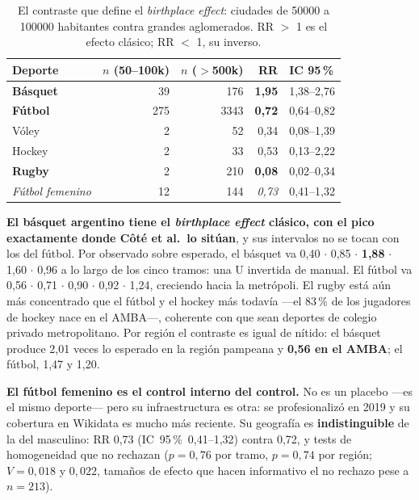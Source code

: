 \documentclass[11pt,a4paper]{article}
\newcommand{\ic}[2]{\mbox{IC 95\,\% #1--#2}}
\begin{document}
\begin{table}[!htb]\centering\small
\caption{El contraste que define el \emph{birthplace effect}: ciudades de
\num{50000} a \num{100000} habitantes contra grandes aglomerados. RR $>$ 1 es el
efecto clásico; RR $<$ 1, su inverso.}
\begin{tabular}{@{}lrrrl@{}}
\toprule
\textbf{Deporte} & \textbf{$n$ (50--100k)} & \textbf{$n$ ($>$500k)} &
\textbf{RR} & \textbf{IC 95\,\%}\\
\midrule
\textbf{Básquet} &  39 &  176 & \textbf{1,95} & 1,38--2,76\\
\textbf{Fútbol}  & 275 & 3343 & \textbf{0,72} & 0,64--0,82\\
Vóley            &   2 &   52 & 0,34 & 0,08--1,39\\
Hockey           &   2 &   33 & 0,53 & 0,13--2,22\\
\textbf{Rugby}   &   2 &  210 & \textbf{0,08} & 0,02--0,34\\
\addlinespace
\emph{Fútbol femenino} & 12 & 144 & \emph{0,73} & 0,41--1,32\\
\bottomrule
\end{tabular}
\end{table}

\textbf{El básquet argentino tiene el \emph{birthplace effect} clásico, con el
pico exactamente donde Côté et al.\ lo sitúan}, y sus intervalos no se tocan con
los del fútbol. Por observado sobre esperado, el básquet va
0,40 $\cdot$ 0,85 $\cdot$ \textbf{1,88} $\cdot$ 1,60 $\cdot$ 0,96 a lo largo de
los cinco tramos: una U invertida de manual. El fútbol va
0,56 $\cdot$ 0,71 $\cdot$ 0,90 $\cdot$ 0,92 $\cdot$ 1,24, creciendo hacia la
metrópoli. El rugby está aún más concentrado que el fútbol y el hockey más todavía
—el 83\,\% de los jugadores de hockey nace en el AMBA—, coherente con que sean
deportes de colegio privado metropolitano. Por región el contraste es igual de
nítido: el básquet produce 2,01 veces lo esperado en la región pampeana y
\textbf{0,56 en el AMBA}; el fútbol, 1,47 y 1,20.

\textbf{El fútbol femenino es el control interno del control.} No es un placebo
—es el mismo deporte— pero su infraestructura es otra: se profesionalizó en 2019 y
su cobertura en Wikidata es mucho más reciente. Su geografía es
\textbf{indistinguible} de la del masculino: RR 0,73 (\ic{0,41}{1,32}) contra
0,72, y tests de homogeneidad que no rechazan ($p = 0{,}76$ por tramo,
$p = 0{,}74$ por región; $V = 0{,}018$ y $0{,}022$, tamaños de efecto que hacen
informativo el no rechazo pese a $n = 213$).
\end{document}
